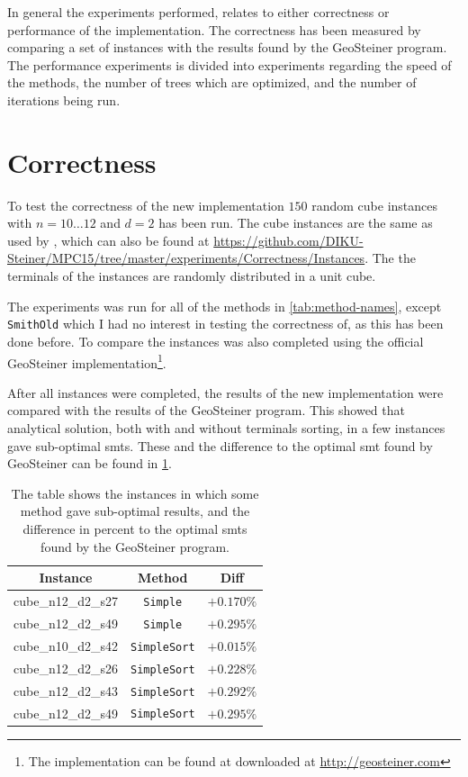 In general the experiments performed, relates to either
correctness or performance of the implementation. The correctness has been
measured by comparing a set of instances with the results found by the
GeoSteiner program. The performance experiments is divided into experiments
regarding the speed of the methods, the number of trees which are optimized, and
the number of iterations being run. 

\section{Correctness}
\label{sec:correctness}

To test the correctness of the new implementation $150$ random cube instances
with $n = 10 \ldots 12$ and $d = 2$ has been run. The cube instances are the
same as used by \textcite{fonseca2014}, which can also be found at
\url{https://github.com/DIKU-Steiner/MPC15/tree/master/experiments/Correctness/Instances}.
The the terminals of the instances are randomly distributed in a unit cube.

The experiments was run for all of the methods in \cref{tab:method-names},
except \texttt{SmithOld} which I had no interest in testing the correctness of,
as this has been done before. To compare the instances was also completed using
the official GeoSteiner implementation\footnote{The implementation can be found
  at downloaded at \url{http://geosteiner.com}}.

After all instances were completed, the results of the new implementation were compared
with the results of the GeoSteiner program. This showed that analytical solution,
both with and without terminals sorting, in a few instances gave sub-optimal
\acp{smt}. These and the difference to the optimal \ac{smt} found by GeoSteiner
can be found in \cref{tab:correctness-errors}.

\begin{table}[htbp]
  \centering
  \begin{tabular}{ccc}
    \toprule
    Instance           & Method              & Diff       \\
    \midrule
    cube\_n12\_d2\_s27 & \texttt{Simple}     & $+0.170\%$ \\
    cube\_n12\_d2\_s49 & \texttt{Simple}     & $+0.295\%$ \\
    cube\_n10\_d2\_s42 & \texttt{SimpleSort} & $+0.015\%$ \\
    cube\_n12\_d2\_s26 & \texttt{SimpleSort} & $+0.228\%$ \\
    cube\_n12\_d2\_s43 & \texttt{SimpleSort} & $+0.292\%$ \\
    cube\_n12\_d2\_s49 & \texttt{SimpleSort} & $+0.295\%$ \\
    \bottomrule
  \end{tabular}
  \caption[Sub-optimal results in correctness test]{The table shows the
    instances in which some method gave sub-optimal results, and the difference
    in percent to the optimal \acp{smt} found by the GeoSteiner
    program.\label{tab:correctness-errors}}
\end{table}

